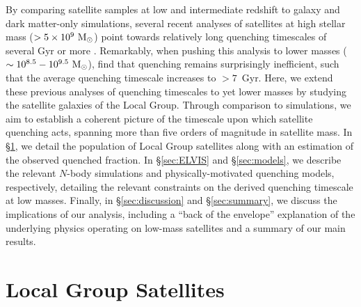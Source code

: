 By comparing satellite samples at low and intermediate redshift to
galaxy and dark matter-only simulations, several recent analyses of
satellites at high stellar mass ($> 5 \times 10^{9}~{\rm M}_{\odot}$) point
towards relatively long quenching timescales of several Gyr or more
\citep{wetzel13, delucia12}. 
%
Remarkably, when pushing this analysis to lower masses ($\sim 10^{8.5}
- 10^{9.5}~{\rm M}_{\odot}$), \citet{wheeler14} find that quenching remains
surprisingly inefficient, such that the average quenching timescale
increases to $> 7$~Gyr. Here, we extend these previous analyses of
quenching timescales to yet lower masses by studying the satellite
galaxies of the Local Group. Through comparison to simulations, we aim
to establish a coherent picture of the timescale upon which satellite
quenching acts, spanning more than five orders of magnitude in
satellite mass. In \S\ref{sec:LG}, we detail the population of Local
Group satellites along with an estimation of the observed quenched
fraction. In \S\ref{sec:ELVIS} and \S\ref{sec:models}, we describe the
relevant $N$-body simulations and physically-motivated quenching
models, respectively, detailing the relevant constraints on the
derived quenching timescale at low masses. Finally, in
\S\ref{sec:discussion} and \S\ref{sec:summary}, we discuss the
implications of our analysis, including a ``back of the envelope''
explanation of the underlying physics operating on low-mass satellites
and a summary of our main results.


\section{Local Group Satellites}
\label{sec:LG}


